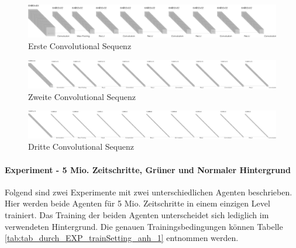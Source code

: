 \begin{figure}[htb!]
    \hspace*{-1.5cm}
    \begin{minipage}{\linewidth}
        \centering
        \includegraphics[scale=0.25]{abb/_networkArch/conv_seq_1}
        \caption*{Erste Convolutional Sequenz}
        \label{fig:pic_impala_net_arch}
    \end{minipage}
\end{figure}
\begin{figure}[htb!]
    \hspace*{-1.5cm}
    \begin{minipage}{\linewidth}
        \centering
        \includegraphics[scale=0.25]{abb/_networkArch/conv_seq_2}
        \caption*{Zweite Convolutional Sequenz}
        \label{fig:pic_impala_net_arch}
    \end{minipage}
\end{figure}
\begin{figure}[htb!]
    \hspace*{-1.5cm}
    \begin{minipage}{\linewidth}
        \centering
        \includegraphics[scale=0.25]{abb/_networkArch/conv_seq_3}
        \caption*{Dritte Convolutional Sequenz}
        \label{fig:pic_impala_net_arch}
    \end{minipage}
\end{figure}

\paragraph{Experiment - 5 Mio. Zeitschritte, Grüner und Normaler Hintergrund}\label{anh_exp_5mio} \hfill \break
Folgend sind zwei Experimente mit zwei unterschiedlichen Agenten beschrieben. Hier werden beide Agenten für 5 Mio. Zeitschritte in einem einzigen Level trainiert. Das Training der beiden Agenten unterscheidet sich lediglich im verwendeten Hintergrund. Die genauen Trainingsbedingungen können Tabelle \ref{tab:tab_durch_EXP_trainSetting_anh_1} entnommen werden.

